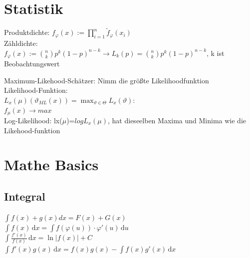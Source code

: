 \documentclass[]{article}
\begin{document}
\section{Statistik}
Produktdichte: $f_\varphi(x):=\prod_{i=1}^{n}\tilde{f}_\varphi(x_i)$\\
Zähldichte:\\
$f_\varphi(x):=$$\binom{n}{k}p^k(1-p)^{n-k}\rightarrow L_k(p)=\binom{n}{k}p^k(1-p)^{n-k}$, k ist Beobachtungswert

Maximum-Likehood-Schätzer: Nimm die größte Likelihoodfunktion \\ 
Likelihood-Funktion: \\ $L_x(\mu)(\vartheta_{ML}(x))=\max_{\vartheta \in \Theta}L_x(\vartheta)$:\\
$f_\mu(x)\rightarrow max$\\
Log-Likelihood: lx($\mu$)=$log L_x(\mu)$, hat dieseelben Maxima und Minima wie 
die Likehood-funktion
\section{Mathe Basics}
\subsection{Integral}
$\int f(x) + g(x) dx = F(x) + G(x)$\\
$\int \! f(x) \, \mathrm{d}x = \int \! f(\varphi(u)) \cdot \varphi'(u) \, \mathrm{d}u$\\
$\int \! \frac{f'(x)}{f(x)} \, \mathrm{d}x = \ln |f(x)| + C$\\
$\int \! f'(x) g(x) \, \mathrm{d}x = f(x) g(x) - \int \! f(x) g'(x) \, \mathrm{d}x$
\end{document}
